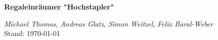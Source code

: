 \documentclass[a4paper, 12pt]{scrartcl}
\begin{document}
\begin{normalsize}

\raggedright\textbf{\Huge Regaleinräumer "Hochstapler"}\\	
		\begin{flushright}
		\textit{Michael Thomas},
		\textit{Andreas Glatz},
		\textit{Simon Weitzel},
		\textit{Felix Baral-Weber}\\
		Stand: \space \today \space \thistime
		\end{flushright}

\end{normalsize}
\tableofcontents




%
\end{document}
